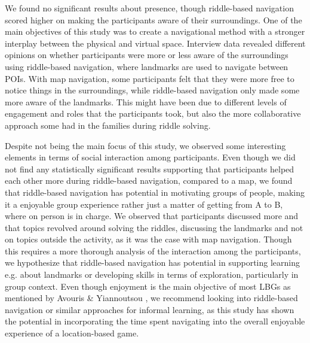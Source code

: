 We found no significant results about presence, though riddle-based navigation scored higher on making the participants aware of their surroundings. One of the main objectives of this study was to create a navigational method with a stronger interplay between the physical and virtual space. Interview data revealed different opinions on whether participants were more or less aware of the surroundings using riddle-based navigation, where landmarks are used to navigate between POIs. With map navigation, some participants felt that they were more free to notice things in the surroundings, while riddle-based navigation only made some more aware of the landmarks. This might have been due to different levels of engagement and roles that the participants took, but also the more collaborative approach some had in the families during riddle solving.   


Despite not being the main focus of this study, we observed some interesting elements in terms of social interaction among participants. Even though we did not find any statistically significant results supporting that participants helped each other more during riddle-based navigation, compared to a map, we found that riddle-based navigation has potential in motivating groups of people, making it a enjoyable group experience rather just a matter of getting from A to B, where on person is in charge. We observed that participants discussed more and that topics revolved around solving the riddles, discussing the landmarks and not on topics outside the activity, as it was the case with map navigation. Though this requires a more thorough analysis of the interaction among the participants, we hypothesize that riddle-based navigation has potential in supporting learning e.g. about landmarks or developing skills in terms of exploration, particularly in group context. Even though enjoyment is the main objective of most LBGs as mentioned by Avouris \& Yiannoutsou \cite{LBG_Review}, we recommend looking into riddle-based navigation or similar approaches for informal learning, as this study has shown the potential in incorporating the time spent navigating into the overall enjoyable experience of a location-based game. 


